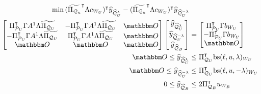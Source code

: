 \documentclass[pdflatex,sn-mathphys-num]{sn-jnl}%
\theoremstyle{thmstyleone}%
\theoremstyle{thmstylethree}%
\theoremstyle{thmstyletwo}%
\begin{document}
\begin{subequations}
\label{lp_extended_reduced}
\begin{align}
    \min\,\transpose{(\transpose{\widetilde{\Pi_{\MQ_u}}} \Lambda c_{W_U})} \widehat{y}_{\widehat{\MQ}^\lambda_U} - \transpose{(\transpose{\widetilde{\Pi_{\MQ_u}}} \Lambda c_{W_U})} \widehat{y}_{\widehat{\MQ}^{-\lambda}_U} & \label{lp_extended_reduced_obj} \\
\begin{bmatrix}
    \transpose{\Pi_{\MP_U}} \Gamma A^1 \Lambda \widetilde{\Pi_{\MQ_U}}& -\transpose{\Pi_{\MP_U}} \Gamma A^1 \Lambda \widetilde{\Pi_{\MQ_U}}&\zerovec
    \\
    -\transpose{\Pi_{\MP_U}}\Gamma A^1 \Lambda \widetilde{\Pi_{\MQ_U}} & \transpose{\Pi_{\MP_U}}\Gamma A^1 \Lambda \widetilde{\Pi_{\MQ_U}}& \zerovec
    \\
    \zerovec & \zerovec & \zerovec 
\end{bmatrix}
\begin{bmatrix}
    \widehat{y}_{\widehat{\MQ}^\lambda_U}\\
    \widehat{y}_{\widehat{\MQ}^{-\lambda}_U}\\
    \widehat{y}_{\widehat{\MQ}_B}
\end{bmatrix} &= \begin{bmatrix}
    \transpose{\Pi_{\MP_U}} \Gamma b_{W_U}\\
    -\transpose{\Pi_{\MP_U}} \Gamma b_{W_U}\\
    \zerovec
\end{bmatrix}\label{lp_extended_reduced_eqs}\\
\zerovec \leq \widehat{y}_{\widehat{\MQ}^\lambda_U} &\leq \transpose{\Pi_{\MQ_U}}\mathrm{bs}(\ell,u,\lambda)_{W_U} \\
\zerovec \leq \widehat{y}_{\widehat{\MQ}^{-\lambda}_U} &\leq \transpose{\Pi_{\MQ_U}}\mathrm{bs}(\ell,u,-\lambda)_{W_U} \label{lp_extended_reduced_unipolar_bounds} \\
0 \leq \widehat{y}_{\widehat{\MQ}_B} &\leq 2 \transpose{\Pi_{\MQ_B}} u_{W_B} \label{lp_extended_reduced_bipolar_bounds}
\end{align}    
\end{subequations}
\end{document}
